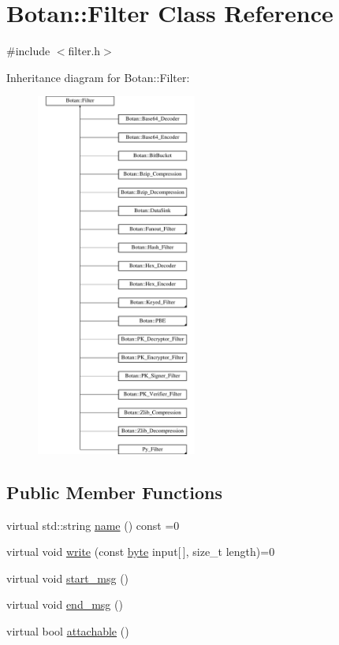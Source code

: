 \hypertarget{classBotan_1_1Filter}{\section{Botan\-:\-:Filter Class Reference}
\label{classBotan_1_1Filter}
}


{\ttfamily \#include $<$filter.\-h$>$}

Inheritance diagram for Botan\-:\-:Filter\-:\begin{figure}[H]
\begin{center}
\leavevmode
\includegraphics[height=12.000000cm]{classBotan_1_1Filter}
\end{center}
\end{figure}
\subsection*{Public Member Functions}
\begin{DoxyCompactItemize}
\item 
virtual std\-::string \hyperlink{classBotan_1_1Filter_a612efd6701e36df4902da3dc396ce62f}{name} () const =0
\item 
virtual void \hyperlink{classBotan_1_1Filter_ad856ce62d9bdcce8057da99cba606892}{write} (const \hyperlink{namespaceBotan_a7d793989d801281df48c6b19616b8b84}{byte} input\mbox{[}$\,$\mbox{]}, size\-\_\-t length)=0
\item 
virtual void \hyperlink{classBotan_1_1Filter_ac4f64aaf61c461e65b554f0158902a3c}{start\-\_\-msg} ()
\item 
virtual void \hyperlink{classBotan_1_1Filter_a5378ec3bf4adf860a4cfa01cfc51e20e}{end\-\_\-msg} ()
\item 
virtual bool \hyperlink{classBotan_1_1Filter_a65dd0725cbacb03c584e415747bb99be}{attachable} ()
\end{DoxyCompactItemize}
